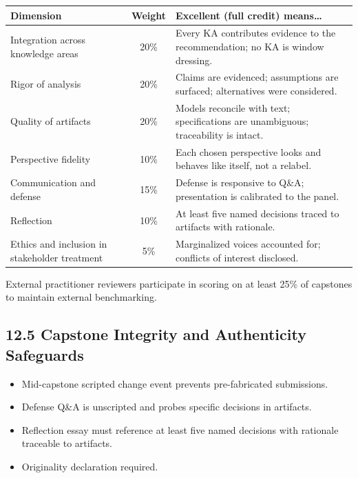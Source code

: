 \documentclass[11pt,letterpaper,oneside]{report}
\begin{document}
\begin{tcolorbox}[callout,colback=afpaper,colframe=afnavy,colbacktitle=afnavy,title=Capstone Composite Rubric R-CAP]
\begin{tabularx}{\linewidth}{@{}R{9.0cm} c >{\RaggedRight\arraybackslash}X@{}}
\toprule
\sffamily\bfseries Dimension & \sffamily\bfseries Weight & \sffamily\bfseries Excellent (full credit) means\dots \\
\midrule
Integration across knowledge areas                  & 20\% & Every KA contributes evidence to the recommendation; no KA is window dressing. \\
Rigor of analysis                                   & 20\% & Claims are evidenced; assumptions are surfaced; alternatives were considered. \\
Quality of artifacts                                & 20\% & Models reconcile with text; specifications are unambiguous; traceability is intact. \\
Perspective fidelity                                & 10\% & Each chosen perspective looks and behaves like itself, not a relabel. \\
Communication and defense                           & 15\% & Defense is responsive to Q\&A; presentation is calibrated to the panel. \\
Reflection                                          & 10\% & At least five named decisions traced to artifacts with rationale. \\
Ethics and inclusion in stakeholder treatment       &  5\% & Marginalized voices accounted for; conflicts of interest disclosed. \\
\bottomrule
\end{tabularx}
\end{tcolorbox}

External practitioner reviewers participate in scoring on at least 25\% of capstones to maintain external benchmarking.

\subsection*{12.5 Capstone Integrity and Authenticity Safeguards}
\begin{itemize}
  \item Mid-capstone scripted change event prevents pre-fabricated submissions.
  \item Defense Q\&A is unscripted and probes specific decisions in artifacts.
  \item Reflection essay must reference at least five named decisions with rationale traceable to artifacts.
  \item Originality declaration required.
\end{itemize}
\end{document}
